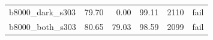 \begin{table}[htbp]
\begin{tabular}{lrrrrr}
b8000\_\allowbreak{}dark\_\allowbreak{}s303 & %
79.70 & %
0.00 & %
99.11 & %
2110 & %
fail \\ %

b8000\_\allowbreak{}both\_\allowbreak{}s303 & %
80.65 & %
79.03 & %
98.59 & %
2099 & %
fail \\ %

\bottomrule
\end{tabular}
\end{table}
\endgroup

